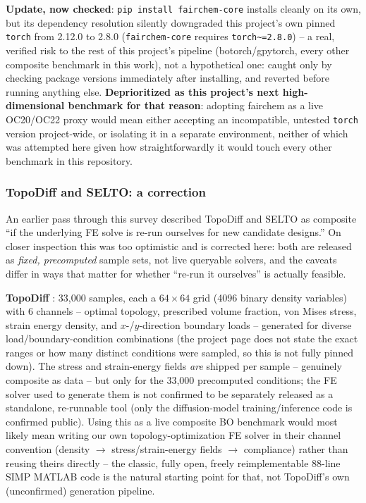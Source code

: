 \documentclass[11pt]{article}
\begin{document}
\textbf{Update, now checked}: \texttt{pip install fairchem-core}
installs cleanly on its own, but its dependency resolution silently
downgraded this project's own pinned \texttt{torch} from 2.12.0 to
2.8.0 (\texttt{fairchem-core} requires \texttt{torch\textasciitilde=2.8.0})
-- a real, verified risk to the rest of this project's pipeline
(botorch/gpytorch, every other composite benchmark in this work), not
a hypothetical one: caught only by checking package versions
immediately after installing, and reverted before running anything
else. \textbf{Deprioritized as this project's next high-dimensional
benchmark for that reason}: adopting fairchem as a live OC20/OC22 proxy
would mean either accepting an incompatible, untested \texttt{torch}
version project-wide, or isolating it in a separate environment,
neither of which was attempted here given how straightforwardly it
would touch every other benchmark in this repository.

\subsubsection{TopoDiff and SELTO: a correction}
\label{sec:topodiff-selto}

An earlier pass through this survey described TopoDiff and SELTO as
composite ``if the underlying FE solve is re-run ourselves for new
candidate designs.'' On closer inspection this was too optimistic and is
corrected here: both are released as \emph{fixed, precomputed} sample
sets, not live queryable solvers, and the caveats differ in ways that
matter for whether ``re-run it ourselves'' is actually feasible.

\textbf{TopoDiff} \citep{maze2023topodiff}: 33,000 samples, each a
$64{\times}64$ grid (4096 binary density variables) with 6 channels --
optimal topology, prescribed volume fraction, von Mises stress, strain
energy density, and $x$-/$y$-direction boundary loads -- generated for
diverse load/boundary-condition combinations (the project page does not
state the exact ranges or how many distinct conditions were sampled, so
this is not fully pinned down). The stress and strain-energy fields
\emph{are} shipped per sample -- genuinely composite as data -- but only
for the 33,000 precomputed conditions; the FE solver used to generate
them is not confirmed to be separately released as a standalone,
re-runnable tool (only the diffusion-model training/inference code is
confirmed public). Using this as a live composite BO benchmark would
most likely mean writing our own topology-optimization FE solver in
their channel convention (density $\to$ stress/strain-energy fields
$\to$ compliance) rather than reusing theirs directly -- the classic,
fully open, freely reimplementable 88-line SIMP MATLAB code
\citep{andreassen2011topopt88} is the natural starting point for that,
not TopoDiff's own (unconfirmed) generation pipeline.
\end{document}
